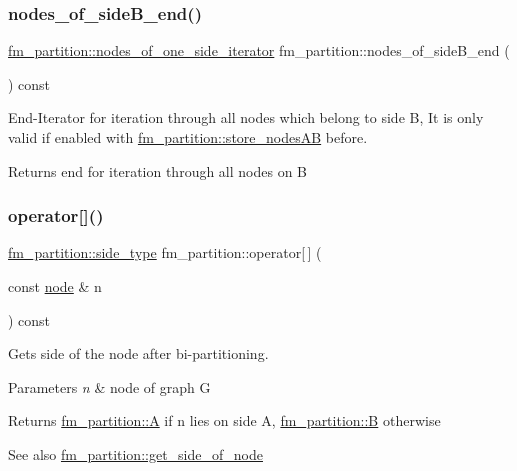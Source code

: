\subsubsection{\texorpdfstring{nodes\+\_\+of\+\_\+side\+B\+\_\+end()}{nodes\_of\_sideB\_end()}}
{\footnotesize\ttfamily \mbox{\hyperlink{classfm__partition_ac8b7b5253476118e5f7bbad2fe8af285}{fm\+\_\+partition\+::nodes\+\_\+of\+\_\+one\+\_\+side\+\_\+iterator}} fm\+\_\+partition\+::nodes\+\_\+of\+\_\+side\+B\+\_\+end (\begin{DoxyParamCaption}{ }\end{DoxyParamCaption}) const}

End-\/\+Iterator for iteration through all nodes which belong to side {\ttfamily B}, It is only valid if enabled with \mbox{\hyperlink{classfm__partition_a8926005b4637055d2acf6f29ad2d9b97}{fm\+\_\+partition\+::store\+\_\+nodes\+AB}} before.

\begin{DoxyReturn}{Returns}
end for iteration through all nodes on {\ttfamily B} 
\end{DoxyReturn}
\mbox{\label{classfm__partition_a45ef6bc577ce894ead2c699678e26f1b}} 
\subsubsection{\texorpdfstring{operator[]()}{operator[]()}}
{\footnotesize\ttfamily \mbox{\hyperlink{classfm__partition_a7cdff1bea3740a287387e8408e16ca79}{fm\+\_\+partition\+::side\+\_\+type}} fm\+\_\+partition\+::operator\mbox{[}$\,$\mbox{]} (\begin{DoxyParamCaption}\item[{const \mbox{\hyperlink{classnode}{node}} \&}]{n }\end{DoxyParamCaption}) const}

Gets side of the node after bi-\/partitioning.


\begin{DoxyParams}{Parameters}
{\em n} & node of graph {\ttfamily G} \\
\hline
\end{DoxyParams}
\begin{DoxyReturn}{Returns}
{\ttfamily \mbox{\hyperlink{classfm__partition_a973d30e9eb0d21f659ef288176cd4791}{fm\+\_\+partition\+::A}}} if {\ttfamily n} lies on side {\ttfamily A}, {\ttfamily \mbox{\hyperlink{classfm__partition_a42515c44eecb7ba3e2ec549a877ef238}{fm\+\_\+partition\+::B}}} otherwise 
\end{DoxyReturn}
\begin{DoxySeeAlso}{See also}
\mbox{\hyperlink{classfm__partition_af5f6ad817fe30760f3bc5470bd70c4c9}{fm\+\_\+partition\+::get\+\_\+side\+\_\+of\+\_\+node}} 
\end{DoxySeeAlso}
\mbox{\label{classfm__partition_a6db2eeb6ae968dbab78302f0448c0ced}} 
